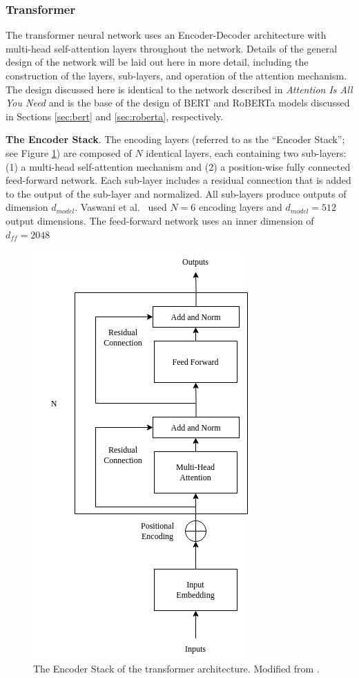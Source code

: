 \documentclass[12pt]{article}
\begin{document}
\subsubsection{Transformer}\label{sec:transformer}
The transformer neural network uses an Encoder-Decoder architecture with multi-head self-attention layers throughout the network. Details of the
general design of the network will be laid out here in more detail, including the construction of the layers, sub-layers, and operation of the
attention mechanism. The design discussed here is identical to the network described in \textit{Attention Is All You Need}
\cite{vaswani_attention_2017} and is the base of the design of BERT and RoBERTa models discussed in Sections \ref{sec:bert} and \ref{sec:roberta},
respectively.

\textbf{The Encoder Stack}. The encoding layers (referred to as the ``Encoder Stack''; see Figure \ref{fig:transformer_encoder_stack}) are composed
of $N$ identical layers, each containing two sub-layers: (1) a multi-head self-attention mechanism and (2) a position-wise fully connected
feed-forward network. Each sub-layer includes a residual connection that is added to the output of the sub-layer and normalized. All sub-layers
produce outputs of dimension $d_{model}$. Vaswani et al.~\cite{vaswani_attention_2017} used $N=6$ encoding layers and $d_{model} = 512$ output
dimensions. The feed-forward network uses an inner dimension of $d_{ff} = 2048$

\begin{figure}
    \centering
    \includegraphics[width=0.5\linewidth]{figures/transformer_encoder_stack.png}
    \caption{The Encoder Stack of the transformer architecture. Modified from \cite{vaswani_attention_2017}.}
    \label{fig:transformer_encoder_stack}
\end{figure}
\end{document}
